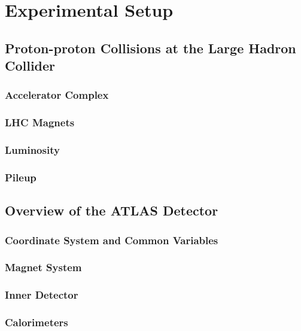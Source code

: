 \chapter{Experimental Setup}



\section{Proton-proton Collisions at the Large Hadron Collider}

\subsection{Accelerator Complex}

\subsection{LHC Magnets}

\subsection{Luminosity}

\subsection{Pileup}



\section{Overview of the ATLAS Detector}

\subsection{Coordinate System and Common Variables}

\subsection{Magnet System}

\subsection{Inner Detector}

\subsection{Calorimeters} %

